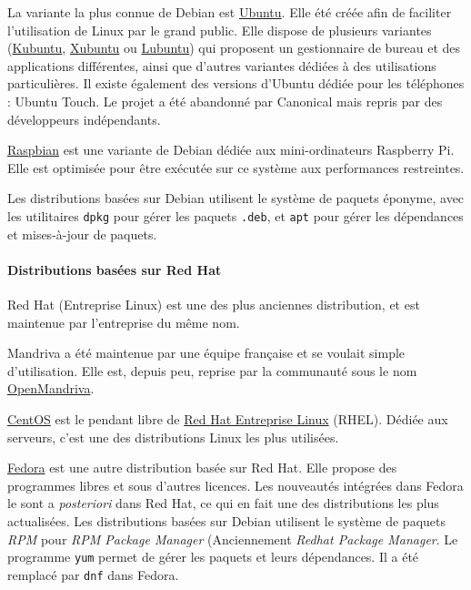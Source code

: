La variante la plus connue de Debian est \href{https://www.ubuntu.com}{Ubuntu}. Elle été créée afin de faciliter l'utilisation de Linux par le grand public. Elle dispose de plusieurs variantes (\href{https://kubuntu.org}{Kubuntu}, \href{https://xubuntu.org}{Xubuntu} ou \href{https://lubuntu.net/}{Lubuntu}) qui proposent un gestionnaire de bureau et des applications différentes, ainsi que d'autres variantes dédiées à des utilisations particulières. Il existe également des versions d'Ubuntu dédiée pour les téléphones : Ubuntu Touch. Le projet a été abandonné par Canonical mais repris par des développeurs indépendants.

\href{https://www.raspberrypi.org/downloads/raspbian/}{Raspbian} est une variante de Debian dédiée aux mini-ordinateurs Raspberry Pi. Elle est optimisée pour être exécutée sur ce système aux performances restreintes.

Les distributions basées sur Debian utilisent le système de paquets éponyme, avec les utilitaires \texttt{dpkg} pour gérer les paquets \texttt{.deb}, et \texttt{apt} pour gérer les dépendances et mises-à-jour de paquets.

\paragraph{Distributions basées sur Red Hat}

Red Hat (Entreprise Linux) est une des plus anciennes distribution, et est maintenue par l'entreprise du même nom.

Mandriva a été maintenue par une équipe française et se voulait simple d'utilisation. Elle est, depuis peu, reprise par la communauté sous le nom \href{https://www.openmandriva.org}{OpenMandriva}.

\href{https://www.centos.org}{CentOS} est le pendant libre de  \href{https://www.redhat.com/en/technologies/linux-platforms/enterprise-linux}{Red Hat Entreprise Linux} (RHEL). Dédiée aux serveurs, c'est une des distributions Linux les plus utilisées.

\href{https://getfedora.org/}{Fedora} est une autre distribution basée sur Red Hat. Elle propose des programmes libres et sous d'autres licences. Les nouveautés intégrées dans Fedora le sont a \textit{posteriori} dans Red Hat, ce qui en fait une des distributions les plus actualisées.
Les distributions basées sur Debian utilisent le système de paquets \textit{RPM} pour \textit{RPM Package Manager} (Anciennement \textit{Redhat Package Manager}. Le programme \texttt{yum} permet de gérer les paquets et leurs dépendances. Il a été remplacé par \texttt{dnf} dans Fedora.

